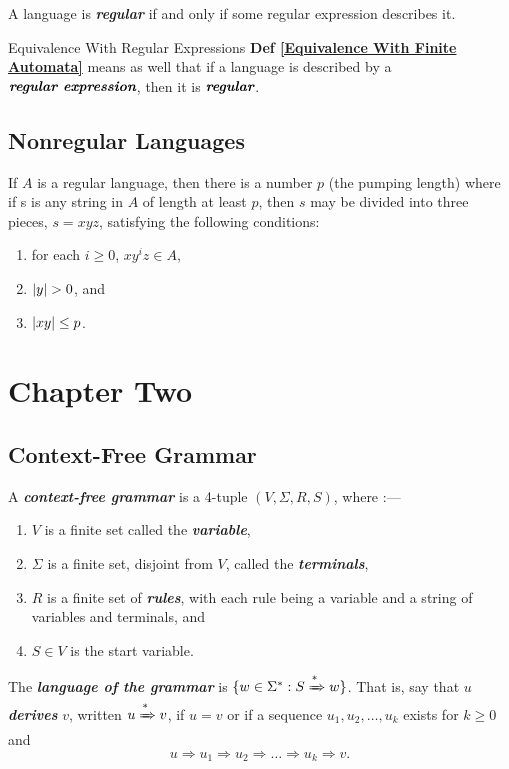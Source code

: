 \documentclass[12pt]{article}
\begin{document}
\begin{definition}
  \label{Equivalence With Finite Automata}
  A language is \textit{\textbf{regular}} if and only if some regular expression
  describes it.
\end{definition}

\begin{definition}{Equivalence With Regular Expressions}
  \textbf{Def \ref{Equivalence With Finite Automata}} means as well that if
  a language is described by a $\textit{\textbf{regular expression}}$, then
  it is $\textit{\textbf{regular}}$.
\end{definition}

\subsection{Nonregular Languages}
\label{sec:org6584c3b}
\begin{definition}
  If $A$  is a  regular language,  then there  is a  number $p$  (the pumping
  length) where if  s is any string in  $A$ of length at least  $p$, then $s$
  may  be  divided  into  three pieces,  $s=xyz$,  satisfying  the  following
  conditions:
  \begin{enumerate}
    \item for each $i \ge 0$, $xy^iz \in A$,
    \item $\left|y\right| > 0$, and 
    \item $\left|xy\right| \le p$.
  \end{enumerate}
\end{definition}

\section{Chapter Two}
\label{sec:org6fb53e9}
\subsection{Context-Free Grammar}
\label{sec:org2e2f0d1}
\begin{definition}
  A \textit{\textbf{context-free grammar}} is a 4-tuple $(V,\Sigma,R,S)$,
  where :---
  \begin{enumerate}
  \item $V$ is a finite set called the \textit{\textbf{variable}},
  \item $\Sigma$ is a finite set, disjoint from $V$, called the
    \textit{\textbf{terminals}},
  \item $R$ is a finite set of \textit{\textbf{rules}}, with each rule being a
    variable and a string of variables and terminals, and
  \item $S \in V$ is the start variable.
  \end{enumerate}
  The \textit{\textbf{language of the grammar}} is $\{w\in\Sigma^* : S
  \xRightarrow[]{\text{*}} w\}$. That is, say that $u$
  \textit{\textbf{derives}} $v$, written $u \xRightarrow[]{\text{*}} v$, if
  $u=v$ or if a sequence $u_1,u_2,\dots,u_k$ exists for $k\ge0$ and
  $$u\Rightarrow u_1 \Rightarrow u_2 \Rightarrow \dots \Rightarrow u_k
  \Rightarrow v.$$
\end{definition}
\end{document}
